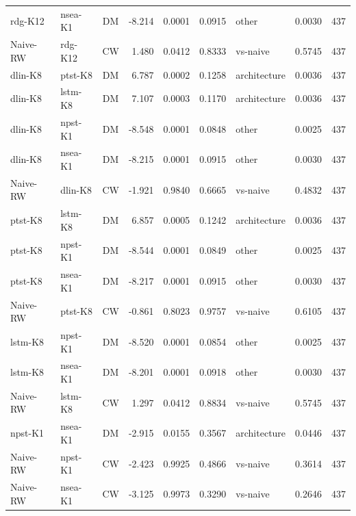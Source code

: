 \begin{table}[!t]
\begin{tabular}{llcrrrlrr}
rdg-K12 & nsea-K1 & DM & -8.214 & 0.0001 & 0.0915 & other & 0.0030 & 437 \\
Naive-RW & rdg-K12 & CW & 1.480 & 0.0412 & 0.8333 & vs-naive & 0.5745 & 437 \\
dlin-K8 & ptst-K8 & DM & 6.787 & 0.0002 & 0.1258 & architecture & 0.0036 & 437 \\
dlin-K8 & lstm-K8 & DM & 7.107 & 0.0003 & 0.1170 & architecture & 0.0036 & 437 \\
dlin-K8 & npst-K1 & DM & -8.548 & 0.0001 & 0.0848 & other & 0.0025 & 437 \\
dlin-K8 & nsea-K1 & DM & -8.215 & 0.0001 & 0.0915 & other & 0.0030 & 437 \\
Naive-RW & dlin-K8 & CW & -1.921 & 0.9840 & 0.6665 & vs-naive & 0.4832 & 437 \\
ptst-K8 & lstm-K8 & DM & 6.857 & 0.0005 & 0.1242 & architecture & 0.0036 & 437 \\
ptst-K8 & npst-K1 & DM & -8.544 & 0.0001 & 0.0849 & other & 0.0025 & 437 \\
ptst-K8 & nsea-K1 & DM & -8.217 & 0.0001 & 0.0915 & other & 0.0030 & 437 \\
Naive-RW & ptst-K8 & CW & -0.861 & 0.8023 & 0.9757 & vs-naive & 0.6105 & 437 \\
lstm-K8 & npst-K1 & DM & -8.520 & 0.0001 & 0.0854 & other & 0.0025 & 437 \\
lstm-K8 & nsea-K1 & DM & -8.201 & 0.0001 & 0.0918 & other & 0.0030 & 437 \\
Naive-RW & lstm-K8 & CW & 1.297 & 0.0412 & 0.8834 & vs-naive & 0.5745 & 437 \\
npst-K1 & nsea-K1 & DM & -2.915 & 0.0155 & 0.3567 & architecture & 0.0446 & 437 \\
Naive-RW & npst-K1 & CW & -2.423 & 0.9925 & 0.4866 & vs-naive & 0.3614 & 437 \\
Naive-RW & nsea-K1 & CW & -3.125 & 0.9973 & 0.3290 & vs-naive & 0.2646 & 437 \\
\bottomrule
\end{tabular}

\end{table}
